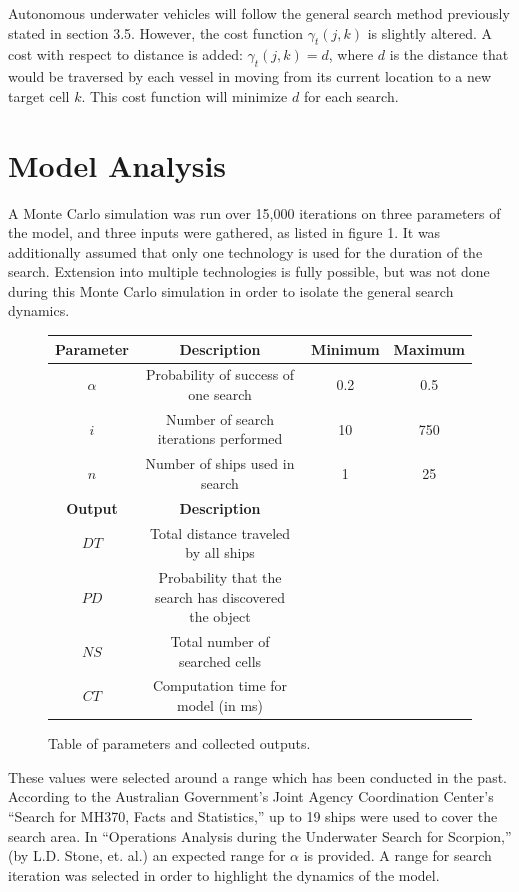 \documentclass[a4paper]{article}
\begin{document}
Autonomous underwater vehicles will follow the general search method previously stated in section 3.5. However, the cost function $\gamma_t(j,k)$ is slightly altered. A cost with respect to distance is added: $\gamma_t(j,k)=d$, where $d$ is the distance that would be traversed by each vessel in moving from its current location to a new target cell $k$. This cost function will minimize $d$ for each search. 

\section{Model Analysis}

A Monte Carlo simulation was run over 15,000 iterations on three parameters of the model, and three inputs were gathered, as listed in figure 1. It was additionally assumed that only one technology is used for the duration of the search. Extension into multiple technologies is fully possible, but was not done during this Monte Carlo simulation in order to isolate the general search dynamics.

\begin{figure}[H]\begin{center}\begin{tabular}{|c|c|c|c|}
\hline \textbf{Parameter} & \textbf{Description} & \textbf{Minimum} & \textbf{Maximum}\\\hline\hline
$\alpha$ & Probability of success of one search & 0.2 & 0.5 \\\hline
$i$ & Number of search iterations performed & 10 & 750 \\\hline
$n$ & Number of ships used in search & 1 & 25 \\\hline\hline
\textbf{Output} & \textbf{Description} &&\\\hline
$DT$ & Total distance traveled by all ships &&\\\hline
$PD$ & Probability that the search has discovered the object &&\\\hline
$NS$ & Total number of searched cells &&\\\hline
$CT$ & Computation time for model (in ms) &&\\\hline
\end{tabular}\end{center}
\caption{Table of parameters and collected outputs.}
\end{figure}

These values were selected around a range which has been conducted in the past.  According to the Australian Government's Joint Agency Coordination Center's ``Search for MH370, Facts and Statistics,'' up to 19 ships were used to cover the search area. In ``Operations Analysis during the Underwater Search for Scorpion,'' (by L.D. Stone, et. al.) an expected range for $\alpha$ is provided.  A range for search iteration was selected in order to highlight the dynamics of the model.
\end{document}
